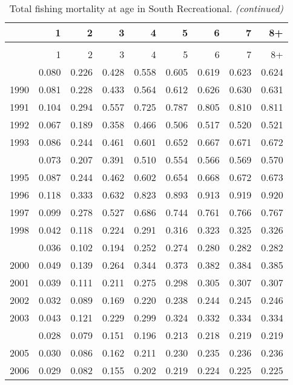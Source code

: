 \documentclass[
]{article}
\begin{document}
\begin{longtable}[t]{lrrrrrrrr}
\caption{\label{tab:South_Recreational-fleet-FAA-table}Total fishing mortality at age in South Recreational.}\\
\toprule
  & 1 & 2 & 3 & 4 & 5 & 6 & 7 & 8+\\
\midrule
\endfirsthead
\caption[]{Total fishing mortality at age in South Recreational. \textit{(continued)}}\\
\toprule
  & 1 & 2 & 3 & 4 & 5 & 6 & 7 & 8+\\
\midrule
\endhead

\endfoot
\bottomrule
\endlastfoot
1989 & 0.080 & 0.226 & 0.428 & 0.558 & 0.605 & 0.619 & 0.623 & 0.624\\
1990 & 0.081 & 0.228 & 0.433 & 0.564 & 0.612 & 0.626 & 0.630 & 0.631\\
1991 & 0.104 & 0.294 & 0.557 & 0.725 & 0.787 & 0.805 & 0.810 & 0.811\\
1992 & 0.067 & 0.189 & 0.358 & 0.466 & 0.506 & 0.517 & 0.520 & 0.521\\
1993 & 0.086 & 0.244 & 0.461 & 0.601 & 0.652 & 0.667 & 0.671 & 0.672\\
\addlinespace
1994 & 0.073 & 0.207 & 0.391 & 0.510 & 0.554 & 0.566 & 0.569 & 0.570\\
1995 & 0.087 & 0.244 & 0.462 & 0.602 & 0.654 & 0.668 & 0.672 & 0.673\\
1996 & 0.118 & 0.333 & 0.632 & 0.823 & 0.893 & 0.913 & 0.919 & 0.920\\
1997 & 0.099 & 0.278 & 0.527 & 0.686 & 0.744 & 0.761 & 0.766 & 0.767\\
1998 & 0.042 & 0.118 & 0.224 & 0.291 & 0.316 & 0.323 & 0.325 & 0.326\\
\addlinespace
1999 & 0.036 & 0.102 & 0.194 & 0.252 & 0.274 & 0.280 & 0.282 & 0.282\\
2000 & 0.049 & 0.139 & 0.264 & 0.344 & 0.373 & 0.382 & 0.384 & 0.385\\
2001 & 0.039 & 0.111 & 0.211 & 0.275 & 0.298 & 0.305 & 0.307 & 0.307\\
2002 & 0.032 & 0.089 & 0.169 & 0.220 & 0.238 & 0.244 & 0.245 & 0.246\\
2003 & 0.043 & 0.121 & 0.229 & 0.299 & 0.324 & 0.332 & 0.334 & 0.334\\
\addlinespace
2004 & 0.028 & 0.079 & 0.151 & 0.196 & 0.213 & 0.218 & 0.219 & 0.219\\
2005 & 0.030 & 0.086 & 0.162 & 0.211 & 0.230 & 0.235 & 0.236 & 0.236\\
2006 & 0.029 & 0.082 & 0.155 & 0.202 & 0.219 & 0.224 & 0.225 & 0.225\\

\end{longtable}
\end{document}
